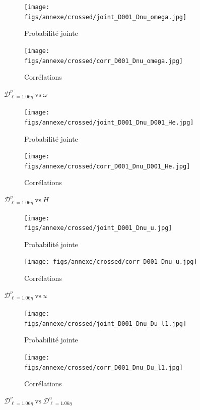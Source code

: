 \documentclass[13pt, a4paper]{extarticle}
\begin{document}
\begin{figure}[H]
  \centering
  \begin{subfigure}[b]{0.48\linewidth}
  \centering
  \texttt{[image: figs/annexe/crossed/joint\_D001\_Dnu\_omega.jpg]}
  \caption{Probabilité jointe}
  \end{subfigure}
  \begin{subfigure}[b]{0.48\linewidth}
    \centering
    \texttt{[image: figs/annexe/crossed/corr\_D001\_Dnu\_omega.jpg]}
    \caption{Corrélations}
    \end{subfigure}
    \caption{$\mathscr{D}^\nu_{\ell=1.06\eta}~\text{vs}~\omega$}
\end{figure}

\begin{figure}[H]
  \centering
  \begin{subfigure}[b]{0.48\linewidth}
  \centering
  \texttt{[image: figs/annexe/crossed/joint\_D001\_Dnu\_D001\_He.jpg]}
  \caption{Probabilité jointe}
  \end{subfigure}
  \begin{subfigure}[b]{0.48\linewidth}
    \centering
    \texttt{[image: figs/annexe/crossed/corr\_D001\_Dnu\_D001\_He.jpg]}
    \caption{Corrélations}
    \end{subfigure}
    \caption{$\mathscr{D}^\nu_{\ell=1.06\eta}~\text{vs}~H$}
\end{figure}

\begin{figure}[H]
  \centering
  \begin{subfigure}[b]{0.48\linewidth}
  \centering
  \texttt{[image: figs/annexe/crossed/joint\_D001\_Dnu\_u.jpg]}
  \caption{Probabilité jointe}
  \end{subfigure}
  \begin{subfigure}[b]{0.48\linewidth}
    \centering
    \texttt{[image: figs/annexe/crossed/corr\_D001\_Dnu\_u.jpg]}
    \caption{Corrélations}
    \end{subfigure}
    \caption{$\mathscr{D}^\nu_{\ell=1.06\eta}~\text{vs}~u$}
\end{figure}

\begin{figure}[H]
  \centering
  \begin{subfigure}[b]{0.48\linewidth}
  \centering
  \texttt{[image: figs/annexe/crossed/joint\_D001\_Dnu\_Du\_l1.jpg]}
  \caption{Probabilité jointe}
  \end{subfigure}
  \begin{subfigure}[b]{0.48\linewidth}
    \centering
    \texttt{[image: figs/annexe/crossed/corr\_D001\_Dnu\_Du\_l1.jpg]}
    \caption{Corrélations}
    \end{subfigure}
    \caption{$\mathscr{D}^\nu_{\ell=1.06\eta}~\text{vs}~\mathscr{D}^u_{\ell=1.06\eta}$}
\end{figure}
\end{document}
